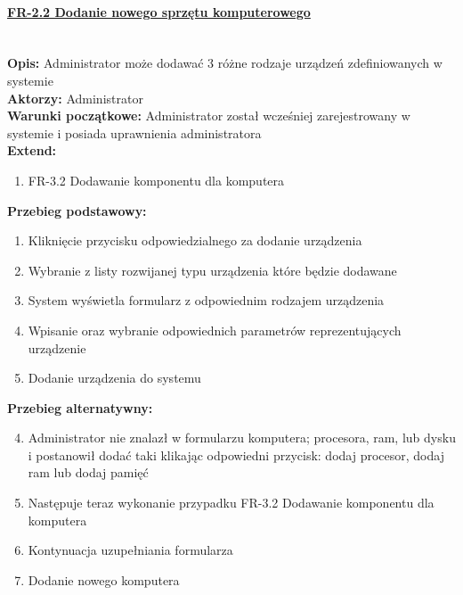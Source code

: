 \paragraph{\underline{FR-2.2 Dodanie nowego sprzętu komputerowego}}\mbox{}\\[1mm]
	\noindent\textbf{Opis:} Administrator może dodawać 3 różne rodzaje urządzeń zdefiniowanych w systemie\\
	\noindent\textbf{Aktorzy:} Administrator\\
	\textbf{Warunki początkowe:} Administrator został wcześniej zarejestrowany w systemie i posiada uprawnienia administratora\\
	\textbf{Extend:} 
	\begin{enumerate}[noparskip]
		\item FR-3.2 Dodawanie komponentu dla komputera
	\end{enumerate}
	\textbf{Przebieg podstawowy:}
	\begin{enumerate}[noparskip]
		\item Kliknięcie przycisku odpowiedzialnego za dodanie urządzenia
    \item Wybranie z listy rozwijanej typu urządzenia które będzie dodawane
		\item System wyświetla formularz z odpowiednim rodzajem urządzenia
		\item Wpisanie oraz wybranie odpowiednich parametrów reprezentujących urządzenie
		\item Dodanie urządzenia do systemu	\end{enumerate} 
	\textbf{Przebieg alternatywny:}
	\begin{enumerate}[noparskip]\setcounter{enumi}{3}
		\item Administrator nie znalazł w formularzu komputera; procesora, ram, lub dysku i postanowił dodać taki klikając odpowiedni przycisk: dodaj procesor, dodaj ram lub dodaj pamięć
		\item Następuje teraz wykonanie przypadku FR-3.2 Dodawanie komponentu dla komputera
		\item Kontynuacja uzupełniania formularza
		\item Dodanie nowego komputera
	\end{enumerate} \mbox{}\\[-11mm]

